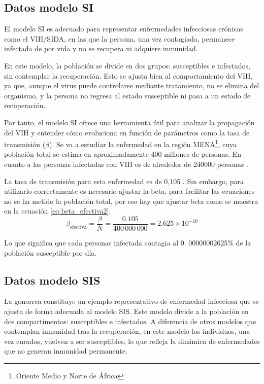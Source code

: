 \subsection{Datos modelo SI}
El modelo SI es adecuado para representar enfermedades infecciosas crónicas como el VIH/SIDA, en las que la persona, una vez contagiada, permanece infectada de por vida y no se recupera ni adquiere inmunidad.

En este modelo, la población se divide en dos grupos: susceptibles e infectados, sin contemplar la recuperación. Esto se ajusta bien al comportamiento del VIH, ya que, aunque el virus puede controlarse mediante tratamiento, no se elimina del organismo, y la persona no regresa al estado susceptible ni pasa a un estado de recuperación.

Por tanto, el modelo SI ofrece una herramienta útil para analizar la propagación del VIH y entender cómo evoluciona en función de parámetros como la tasa de transmisión ($\beta$). 
Se va a estudiar la enfermedad en la región MENA\footnote{Oriente Medio y Norte de África}, cuya población total se estima en aproximadamente 400 millones de personas. En cuanto a las personas infectadas con VIH es de alrededor de 240000 personas \cite{Khorrami2023}.

La tasa de transmisión para esta enfermedad es de 0,105 \cite{shakiba2021epidemiological}. Sin embargo, para utilizarlo correctamente es necesario ajustar la beta, para facilitar las ecuaciones no se ha metido la población total, por eso hay que ajustar beta como se muestra en la ecuación \eqref{eq:beta_efectiva2}.
\begin{equation}
\beta_{\text{efectiva}} = \frac{\beta}{N} = \frac{0.105}{400\,000\,000} = 2.625 \times 10^{-10}
\label{eq:beta_efectiva2}
\end{equation}

Lo que significa que cada personas infectada contagia al 0. 00000002625\% de la población susceptible por día.

\subsection{Datos modelo SIS}
La gonorrea constituye un ejemplo representativo de enfermedad infecciosa que se ajusta de forma adecuada al modelo SIS. Este modelo divide a la población en dos compartimentos: susceptibles e infectados. A diferencia de otros modelos que contemplan inmunidad tras la recuperación, en este modelo los individuos, una vez curados, vuelven a ser susceptibles, lo que refleja la dinámica de enfermedades que no generan inmunidad permanente.

